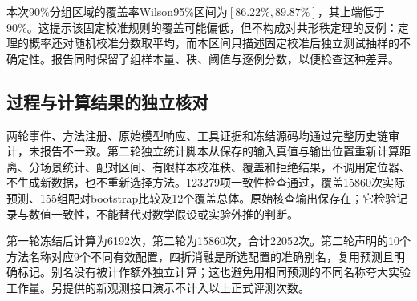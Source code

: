 本次90\%分组区域的覆盖率Wilson95\%区间为$[86.22\%,89.87\%]$，其上端低于90\%。这提示该固定校准规则的覆盖可能偏低，但不构成对共形秩定理的反例：定理的概率还对随机校准分数取平均，而本区间只描述固定校准后独立测试抽样的不确定性。报告同时保留了组样本量、秩、阈值与逐例分数，以便检查这种差异。

\subsection{过程与计算结果的独立核对}
两轮事件、方法注册、原始模型响应、工具证据和冻结源码均通过完整历史链审计，未报告不一致。第二轮独立统计脚本从保存的输入真值与输出位置重新计算距离、分场景统计、配对区间、有限样本校准秩、覆盖和拒绝结果，不调用定位器、不生成新数据，也不重新选择方法。123279项一致性检查通过，覆盖15860次实际预测、155组配对bootstrap比较及12个覆盖总体。原始核查输出保存在；它检验记录与数值一致性，不能替代对数学假设或实验外推的判断。

第一轮冻结后计算为6192次，第二轮为15860次，合计22052次。第二轮声明的10个方法名称对应9个不同有效配置，四折消融是所选配置的准确别名，复用预测且明确标记。别名没有被计作额外独立计算；这也避免用相同预测的不同名称夸大实验工作量。另提供的新观测接口演示不计入以上正式评测次数。
